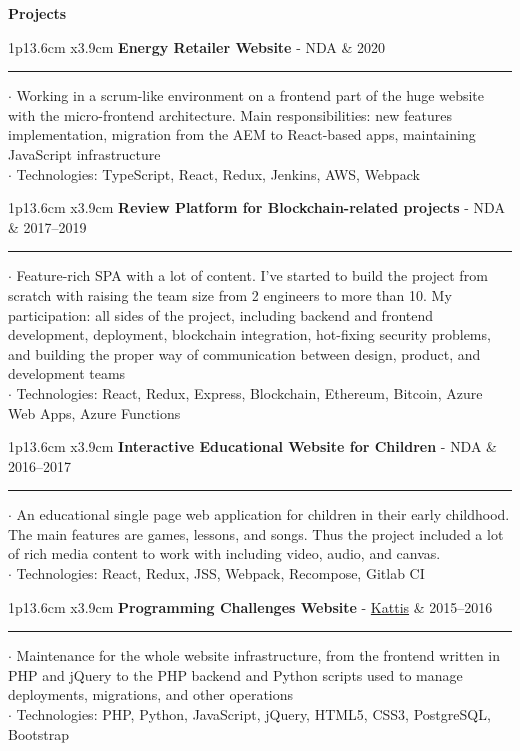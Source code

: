 \documentclass[10pt,A4]{article}
\newcommand{\cvsection}[1]
{
	\begin{center}
		\large\textcolor{sectcol}{\textbf{#1}}
	\end{center}
}
\newcommand{\cvevent}[5]
{
  \begin{tabular*}{1\textwidth}{p{13.6cm}  x{3.9cm}}
  	\textbf{#2} - \textcolor{bgcol}{#3} &   \vspace{2.5pt}\textcolor{sectcol}{#1}
  \end{tabular*}

  \vspace{-8pt}
    \textcolor{softcol}{\hrule}
  \vspace{6pt}

  $\cdot$ #4\\[3pt]
  $\cdot$ #5\\[6pt]
}
\newcommand{\mystrut}{\rule[-.3\baselineskip]{0pt}{\baselineskip}}
\begin{document}
\vspace{-18pt}
\cvsection{Projects}
\vspace{-6pt}

%
\cvevent{2020}
{Energy Retailer Website}
{NDA}
{Working in a scrum-like environment on a frontend part of the huge website with the micro-frontend architecture.
  Main responsibilities: new features implementation, migration from the AEM to React-based apps, maintaining JavaScript infrastructure}
{Technologies: TypeScript, React, Redux, Jenkins, AWS, Webpack}


%
\cvevent{2017–2019}
{Review Platform for Blockchain-related projects}
{NDA}
{Feature-rich SPA with a lot of content.
  I've started to build the project from scratch with raising the team size from 2 engineers to more than 10.
  My participation: all sides of the project, including backend and frontend development,
  deployment, blockchain integration, hot-fixing security problems, and building the proper way of communication
  between design, product, and development teams}
{Technologies: React, Redux, Express, Blockchain, Ethereum, Bitcoin, Azure Web Apps, Azure Functions}


%
\cvevent{2016–2017}
{Interactive Educational Website for Children}
{NDA}
{An educational single page web application for children in their early childhood.
  The main features are games, lessons, and songs.
  Thus the project included a lot of rich media content to work with including video, audio, and canvas.}
{Technologies: React, Redux, JSS, Webpack, Recompose, Gitlab CI}


%
\cvevent{2015–2016}
{Programming Challenges Website}
{\href{https://open.kattis.com/}{Kattis}}
{Maintenance for the whole website infrastructure, from the frontend written in PHP and jQuery
  to the PHP backend and Python scripts used to manage deployments, migrations, and other operations}
{Technologies: PHP, Python, JavaScript, jQuery, HTML5, CSS3, PostgreSQL, Bootstrap}


\null
\vspace*{\fill}
\hspace{-0.25\linewidth}\colorbox{white}{\makebox[1.5\linewidth][c]{\mystrut  \textnormal{\textcolor{sectcol}{\href{https://github.com/102}{github.com/102}}}}}




%
%
%
%
%
%
\end{document}
